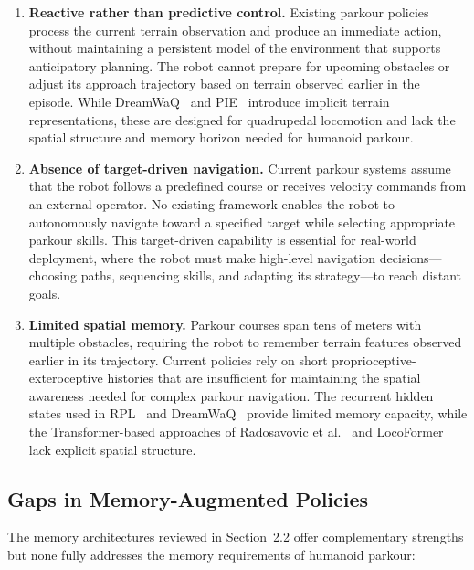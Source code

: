 \begin{enumerate}[leftmargin=2em]
\item \textbf{Reactive rather than predictive control.} Existing parkour policies process the current terrain observation and produce an immediate action, without maintaining a persistent model of the environment that supports anticipatory planning. The robot cannot prepare for upcoming obstacles or adjust its approach trajectory based on terrain observed earlier in the episode. While DreamWaQ~\cite{nahraendra2024dreamwaq} and PIE~\cite{luo2024pie} introduce implicit terrain representations, these are designed for quadrupedal locomotion and lack the spatial structure and memory horizon needed for humanoid parkour.

\item \textbf{Absence of target-driven navigation.} Current parkour systems assume that the robot follows a predefined course or receives velocity commands from an external operator. No existing framework enables the robot to autonomously navigate toward a specified target while selecting appropriate parkour skills. This target-driven capability is essential for real-world deployment, where the robot must make high-level navigation decisions---choosing paths, sequencing skills, and adapting its strategy---to reach distant goals.

\item \textbf{Limited spatial memory.} Parkour courses span tens of meters with multiple obstacles, requiring the robot to remember terrain features observed earlier in its trajectory. Current policies rely on short proprioceptive-exteroceptive histories that are insufficient for maintaining the spatial awareness needed for complex parkour navigation. The recurrent hidden states used in RPL~\cite{zhang2024rpl} and DreamWaQ~\cite{nahraendra2024dreamwaq} provide limited memory capacity, while the Transformer-based approaches of Radosavovic et al.~\cite{radosavovic2024nexttoken} and LocoFormer~\cite{liu2024locoformer} lack explicit spatial structure.
\end{enumerate}

\subsection{Gaps in Memory-Augmented Policies}

The memory architectures reviewed in Section~2.2 offer complementary strengths but none fully addresses the memory requirements of humanoid parkour:

